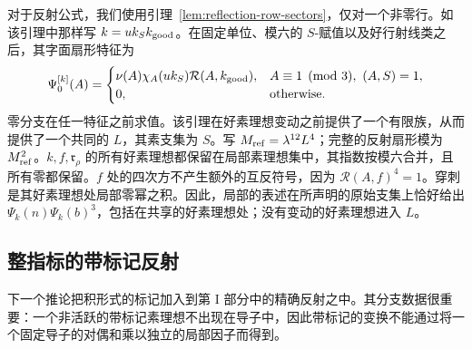 \documentclass[11pt,a4paper]{article}
\numberwithin{equation}{section}
\numberwithin{figure}{section}
\theoremstyle{definition}
\theoremstyle{remark}
\begin{document}
对于反射公式，我们使用引理~\ref{lem:reflection-row-sectors}，仅对一个非零行。如该引理中那样写 \(k=u k_S k_{\rm good}\)。在固定单位、模六的 \(S\)-赋值以及好行射线类之后，其字面扇形特征为
\[
 \Psi_0^{[k]}(A)=
 \begin{cases}
 \nu(A)\chi_A(u k_S)\mathcal R(A,k_{\rm good}),
       &A\equiv1\pmod3,\ (A,S)=1,\\
 0,&\text{otherwise}.
 \end{cases}
\]
零分支在任一特征之前求值。该引理在好素理想变动之前提供了一个有限族，从而提供了一个共同的 \(L\)，其素支集为 \(S\)。写 \(M_{\rm ref}=\lambda^{12}L^4\)；完整的反射扇形模为 \(M_{\rm ref}^2\)。\(k,f,\mathfrak r_\rho\) 的所有好素理想都保留在局部素理想集中，其指数按模六合并，且所有零都保留。\(f\) 处的四次方不产生额外的互反符号，因为 \(\mathcal R(A,f)^4=1\)。穿刺是其好素理想处局部零幂之积。因此，局部的表述在所声明的原始支集上恰好给出 \(\Psi_k(n)\Psi_k(b)^3\)，包括在共享的好素理想处；没有变动的好素理想进入 \(L\)。

\subsection{整指标的带标记反射}\label{par:reflection-marks}

下一个推论把积形式的标记加入到第 I 部分中的精确反射之中。其分支数据很重要：一个非活跃的带标记素理想不出现在导子中，因此带标记的变换不能通过将一个固定导子的对偶和乘以独立的局部因子而得到。
\end{document}
